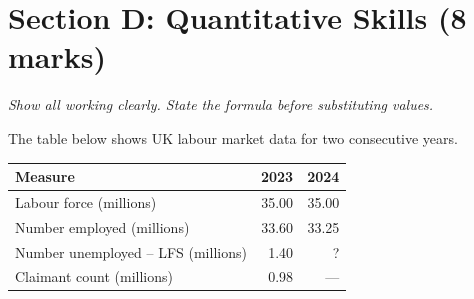 \documentclass[12pt,a4paper]{article}
\begin{document}
\newpage

\section*{Section D: Quantitative Skills (8 marks)}

\textit{Show all working clearly. State the formula before substituting values.}

\vspace{0.8em}

The table below shows UK labour market data for two consecutive years.

\vspace{0.5em}

\begin{table}[h]
    \centering
    \renewcommand{\arraystretch}{1.3}
    \begin{tabular}{@{}lrr@{}}
        \toprule
        \textbf{Measure} & \textbf{2023} & \textbf{2024} \\ \midrule
        Labour force (millions)       & 35.00  & 35.00  \\
        Number employed (millions)    & 33.60  & 33.25  \\
        Number unemployed -- LFS (millions) & 1.40 & ?  \\
        Claimant count (millions)     & 0.98   & ---    \\ \bottomrule
    \end{tabular}
\end{table}

\vspace{0.8em}
\end{document}
